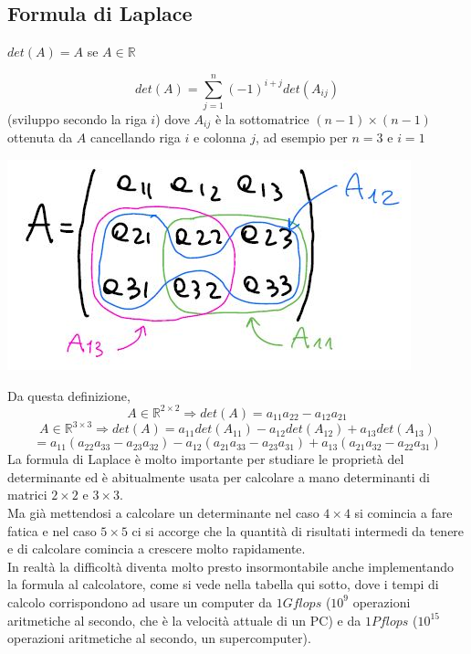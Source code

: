 \documentclass[12pt,a4paper]{article}
\begin{document}
\subsection{Formula di Laplace}
\begin{center}
    $det(A)=A$ se $A\in\mathbb{R}$
\end{center}
\begin{equation*}
    det(A)=\sum_{j=1}^n(-1)^{i+j}det(A_{ij})
\end{equation*}
(sviluppo secondo la riga $i$) dove $A_{ij}$ è la sottomatrice $(n-1)\times(n-1)$ ottenuta da $A$ cancellando riga $i$ e colonna $j$, ad esempio per $n=3$ e $i=1$
\begin{center}
    \includegraphics[scale=0.5]{pag4.jpg}    
\end{center}
Da questa definizione,
\begin{equation*}
    A\in\mathbb{R}^{2\times 2}\Rightarrow det(A)=a_{11}a_{22}-a_{12}a_{21}
\end{equation*}
\begin{equation*}
        A\in\mathbb{R}^{3\times 3}\Rightarrow det(A)=a_{11}det(A_{11})-a_{12}det(A_{12})+a_{13}det(A_{13})
\end{equation*}
\begin{equation*}
    = a_{11}(a_{22}a_{33}-a_{23}a_{32})-a_{12}(a_{21}a_{33}-a_{23}a_{31})+a_{13}(a_{21}a_{32}-a_{22}a_{31})
\end{equation*}
La formula di Laplace è molto importante per studiare le proprietà del determinante ed è abitualmente usata per calcolare a mano determinanti di matrici $2\times 2$ e $3\times 3$.\\
Ma già mettendosi a calcolare un determinante nel caso $4\times 4$ si comincia a fare fatica e nel caso $5\times5$ ci si accorge che la quantità di risultati intermedi da tenere e di calcolare comincia a crescere molto rapidamente.\\In realtà la difficoltà diventa molto presto insormontabile anche implementando la formula al calcolatore, come si vede nella tabella qui sotto, dove i tempi di calcolo corrispondono ad usare un computer da $1Gflops$ ($10^9$ operazioni aritmetiche al secondo, che è la velocità attuale di un PC) e da $1Pflops$ ($10^{15}$ operazioni aritmetiche al secondo, un supercomputer).
\end{document}
